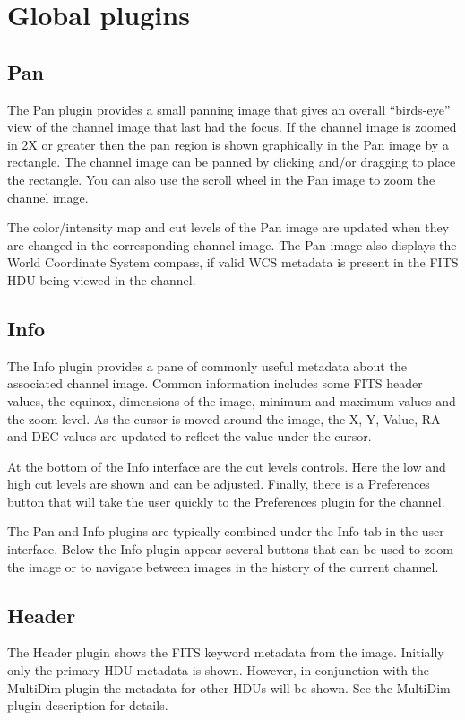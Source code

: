 \documentclass[11pt]{report}
\begin{document}
\section{Global plugins}

\subsection{Pan}
The Pan plugin provides a small panning image that gives an overall
``birds-eye'' view of the channel image that last had the focus.  If the
channel image is zoomed in 2X or greater then the pan region is shown
graphically in the Pan image by a rectangle.  The channel image can be
panned by clicking and/or dragging to place the rectangle.  You can also
use the scroll wheel in the Pan image to zoom the channel image.

The color/intensity map and cut levels of the Pan image are updated
when they are changed in the corresponding channel image.
The Pan image also displays the World Coordinate System compass, if
valid WCS metadata is present in the FITS HDU being viewed in the
channel.

\subsection{Info}
The Info plugin provides a pane of commonly useful metadata about the
associated channel image.  Common information includes some
FITS header values, the equinox, dimensions of the image, minimum and
maximum values and the zoom level.  As the cursor is moved around the
image, the X, Y, Value, RA and DEC values are updated to reflect the
value under the cursor.

At the bottom of the Info interface are the cut levels controls. Here
the low and high cut levels are shown and can be adjusted.  Finally,
there is a Preferences button that will take the user quickly to the
Preferences plugin for the channel.

The Pan and Info plugins are typically combined under the Info tab in
the user interface.  Below the Info plugin appear several buttons that
can be used to zoom the image or to navigate between images in the
history of the current channel.

\subsection{Header}
The Header plugin shows the FITS keyword metadata from the image.
Initially only the primary HDU metadata is shown.  However, in
conjunction with the MultiDim plugin the metadata for other HDUs will be
shown.  See the MultiDim plugin description for details.
\end{document}
